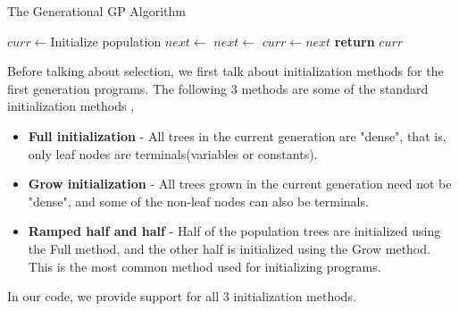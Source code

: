 \begin{algorithm}
  \caption{The Generational GP Algorithm}\label{gpalgo}
  \begin{algorithmic}[1]
  \State $curr \gets $Initialize population  
  \State {} 
  \Repeat
  \State $next \gets $ 
  \State $next \gets $  
  \State {}
  \State $curr \gets next$
  \label{gpalgoendloop}
  \State \textbf{return} $curr$
  \EndProcedure
  \end{algorithmic}
\end{algorithm}

Before talking about selection, we first talk about initialization methods for the first generation programs. The following $3$ methods are some of the standard initialization methods \citep{Koza92},\citep{luke:2000:2ftcaGP}
\begin{itemize}
    \item \textbf{Full initialization} - All trees in the current generation are "dense", that is, only leaf nodes are terminals(variables or constants).
    \item \textbf{Grow initialization} - All trees grown in the current generation need not be "dense", and some of the non-leaf nodes can also be terminals. 
    \item \textbf{Ramped half and half} - Half of the population trees are initialized using the Full method, and the other half is initialized using the Grow method. This is the most common method used for initializing programs.
\end{itemize}
In our code, we provide support for all $3$ initialization methods.
